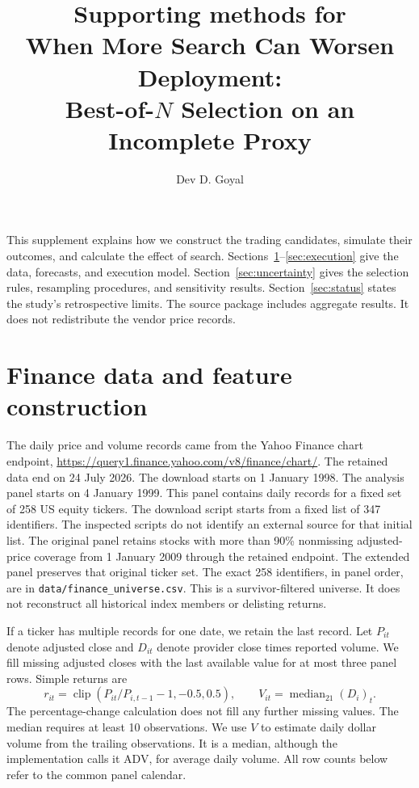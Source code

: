 \documentclass[10pt,letterpaper]{article}
\title{Supporting methods for\\When More Search Can Worsen Deployment:\\Best-of-$N$ Selection on an Incomplete Proxy}
\author{Dev D. Goyal}
\date{}
\begin{document}
\maketitle
\noindent This supplement explains how we construct the trading candidates, simulate their outcomes, and calculate the effect of search. Sections~\ref{sec:data}--\ref{sec:execution} give the data, forecasts, and execution model. Section~\ref{sec:uncertainty} gives the selection rules, resampling procedures, and sensitivity results. Section~\ref{sec:status} states the study's retrospective limits. The source package includes aggregate results. It does not redistribute the vendor price records.

\section{Finance data and feature construction}\label{sec:data}
The daily price and volume records came from the Yahoo Finance chart endpoint, \url{https://query1.finance.yahoo.com/v8/finance/chart/}. The retained data end on 24 July 2026. The download starts on 1 January 1998. The analysis panel starts on 4 January 1999. This panel contains daily records for a fixed set of 258 US equity tickers. The download script starts from a fixed list of 347 identifiers. The inspected scripts do not identify an external source for that initial list. The original panel retains stocks with more than 90\% nonmissing adjusted-price coverage from 1 January 2009 through the retained endpoint. The extended panel preserves that original ticker set. The exact 258 identifiers, in panel order, are in \texttt{data/finance\_universe.csv}. This is a survivor-filtered universe. It does not reconstruct all historical index members or delisting returns.

If a ticker has multiple records for one date, we retain the last record. Let $P_{it}$ denote adjusted close and $D_{it}$ denote provider close times reported volume. We fill missing adjusted closes with the last available value for at most three panel rows. Simple returns are
\[
 r_{it}=\operatorname{clip}(P_{it}/P_{i,t-1}-1,-0.5,0.5),\qquad
 V_{it}=\operatorname{median}_{21}(D_i)_t.
\]
The percentage-change calculation does not fill any further missing values. The median requires at least 10 observations. We use $V$ to estimate daily dollar volume from the trailing observations. It is a median, although the implementation calls it ADV, for average daily volume. All row counts below refer to the common panel calendar.
\end{document}
